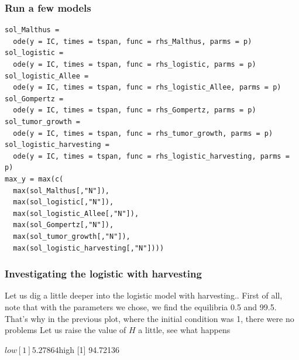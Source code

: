 \documentclass[aspectratio=169]{beamer}
\begin{document}
\begin{frame}[fragile]\frametitle{Run a few models}
\begin{lstlisting}
sol_Malthus = 
  ode(y = IC, times = tspan, func = rhs_Malthus, parms = p)
sol_logistic =
  ode(y = IC, times = tspan, func = rhs_logistic, parms = p)
sol_logistic_Allee =
  ode(y = IC, times = tspan, func = rhs_logistic_Allee, parms = p)
sol_Gompertz =
  ode(y = IC, times = tspan, func = rhs_Gompertz, parms = p)
sol_tumor_growth =
  ode(y = IC, times = tspan, func = rhs_tumor_growth, parms = p)
sol_logistic_harvesting =
  ode(y = IC, times = tspan, func = rhs_logistic_harvesting, parms = p)
max_y = max(c(
  max(sol_Malthus[,"N"]),
  max(sol_logistic[,"N"]),
  max(sol_logistic_Allee[,"N"]),
  max(sol_Gompertz[,"N"]),
  max(sol_tumor_growth[,"N"]),
  max(sol_logistic_harvesting[,"N"])))
\end{lstlisting}
\end{frame}





\begin{frame}[fragile]\frametitle{Investigating the logistic with harvesting}
Let us dig a little deeper into the logistic model with harvesting..
\vfill
First of all, note that with the parameters we chose, we find the equilibria
0.5 and 99.5. That's why in the previous plot, where the initial condition was 1, there were no problems
\vfill
Let us raise the value of $H$ a little, see what happens
\begin{Schunk}
\begin{Soutput}
$low
[1] 5.27864

$high
[1] 94.72136
\end{Soutput}
\end{Schunk}
\end{frame}
\end{document}
